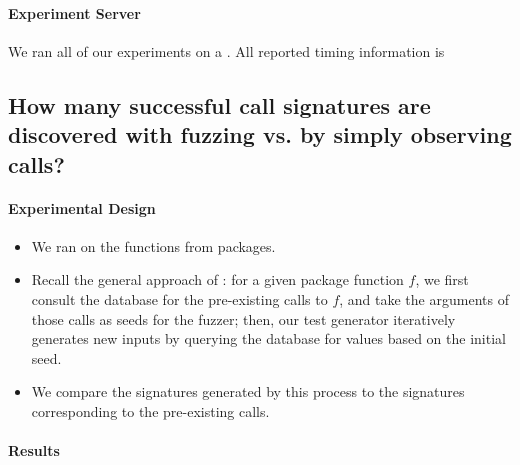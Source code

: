 \paragraph{Experiment Server} 
We ran all of our experiments on a .
All reported timing information is 

%
%

\subsection{How many successful call signatures are discovered with fuzzing vs. by simply observing calls?}

\paragraph{Experimental Design}
\begin{itemize}
    \item We ran \tool on the   functions from  packages.
    \item Recall the general approach of \tool: for a given package function $f$, we first consult the database for the pre-existing calls to $f$, and take the arguments of those calls as seeds for the fuzzer; then, our test generator iteratively generates new inputs by querying the database for values based on the initial seed.
    \item We compare the signatures generated by this process to the signatures corresponding to the pre-existing calls.
\end{itemize}

\paragraph{Results}
